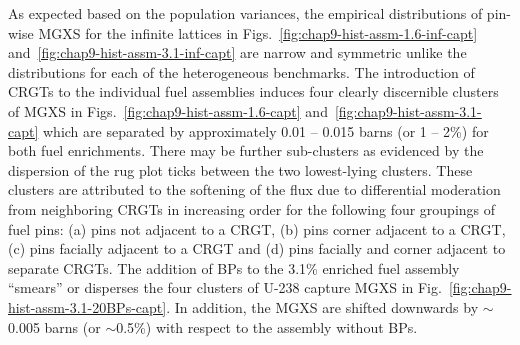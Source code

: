 As expected based on the population variances, the empirical distributions of pin-wise \ac{MGXS} for the infinite lattices in Figs.~\ref{fig:chap9-hist-assm-1.6-inf-capt} and~\ref{fig:chap9-hist-assm-3.1-inf-capt} are narrow and symmetric unlike the distributions for each of the heterogeneous benchmarks. The introduction of \acp{CRGT} to the individual fuel assemblies induces four clearly discernible clusters of \ac{MGXS} in Figs.~\ref{fig:chap9-hist-assm-1.6-capt} and~\ref{fig:chap9-hist-assm-3.1-capt} which are separated by approximately 0.01 -- 0.015 barns (or 1 -- 2\%) for both fuel enrichments. There may be further sub-clusters as evidenced by the dispersion of the rug plot ticks between the two lowest-lying clusters. These clusters are attributed to the softening of the flux due to differential moderation from neighboring \acp{CRGT} in increasing order for the following four groupings of fuel pins: (a) pins not adjacent to a \ac{CRGT}, (b) pins corner adjacent to a \ac{CRGT}, (c) pins facially adjacent to a \ac{CRGT} and (d) pins facially and corner adjacent to separate \acp{CRGT}. The addition of \acp{BP} to the 3.1\% enriched fuel assembly ``smears'' or disperses the four clusters of U-238 capture \ac{MGXS} in Fig.~\ref{fig:chap9-hist-assm-3.1-20BPs-capt}. In addition, the \ac{MGXS} are shifted downwards by $\sim$0.005 barns (or $\sim$0.5\%) with respect to the assembly without \acp{BP}.


